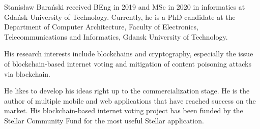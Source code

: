 \documentclass{ieeeaccess}
\begin{document}


\EOD


\begin{IEEEbiography}{Stanis\l{}aw Bara{\'n}ski} received BEng in 2019 and MSc in 2020 in informatics at Gdańsk University of Technology. 
Currently, he is a PhD candidate at the Department of Computer Architecture, Faculty of Electronics, Telecommunications and Informatics, Gdansk University of Technology.

His research interests include blockchains and cryptography, especially the issue of blockchain-based internet voting and mitigation of content poisoning attacks via blockchain.

He likes to develop his ideas right up to the commercialization stage. He is the author of multiple mobile and web applications that have reached success on the market. His blockchain-based internet voting project has been funded by the Stellar Community Fund for the most useful Stellar application. 
\end{IEEEbiography}
\end{document}
